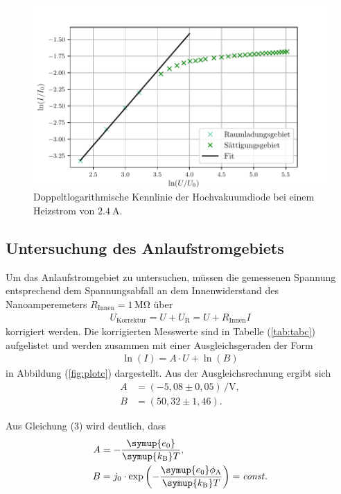 \begin{figure}[H]
  \centering
  \includegraphics{plotb.pdf}
  \caption{Doppeltlogarithmische Kennlinie der Hochvakuumdiode bei einem Heizstrom von $\SI{2.4}{\ampere}$.}
  \label{fig:plotb}
\end{figure}

\subsection{Untersuchung des Anlaufstromgebiets}
Um das Anlaufstromgebiet zu untersuchen, müssen die gemessenen Spannung entsprechend
dem Spannungsabfall an dem Innenwiderstand des Nanoamperemeters $R_\text{Innen} = 1\,\si{\mega\ohm}$
über
\begin{align*}
U_\text{Korrektur} = U + U_\text{R} = U + R_\text{Innen} I
\end{align*}
korrigiert werden. Die korrigierten Messwerte sind in Tabelle (\ref{tab:tabc}) aufgelistet und werden
zusammen mit einer Ausgleichsgeraden der Form
\begin{align*}
\ln(I) = A\cdot U + \ln(B)
\end{align*} 
in Abbildung (\ref{fig:plotc}) dargestellt. Aus der Ausgleichsrechnung ergibt sich
\begin{align*}
A &= (-5,08 \pm 0,05)\,\si{\per\volt},\\
B &= (50,32 \pm 1,46).
\end{align*}

Aus Gleichung (3) wird deutlich, dass
\begin{align*}
  A &= -\frac{\symup{e_\text{0}}}{\symup{k_\text{B}} T}, \\
  B &= j_0 \cdot \exp\left(-\frac{\symup{e_\text{0}} \phi_\text{A}}{\symup{k_\text{B}} T}\right) = \mathit{const}.
\end{align*}

